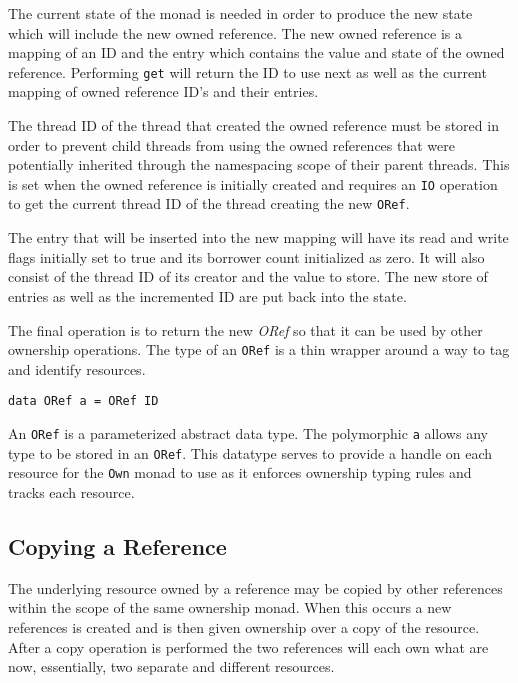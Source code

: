\documentclass[onehalf,11pt]{beavtex}
\begin{document}
The current state of the monad is needed in order
to produce the new state which will include the new owned reference.
The new owned reference is a mapping of an ID and the entry which contains
the value and state of the owned reference.
Performing \texttt{get} will return the ID to use next as well as the current
mapping of owned reference ID's and their entries.

The thread ID of the thread that created the owned reference must
be stored in order to prevent child threads from using the owned references that
were potentially inherited through the namespacing scope of their parent
threads.  This is set when the owned reference is initially created and requires
an \texttt{IO} operation to get the current thread ID of the thread
creating the new \texttt{ORef}.

The entry that will be inserted into the new mapping will have its read and
write flags initially set to true and its borrower count initialized as zero.
It will also consist of the thread ID of its creator and the value to store.
The new store of entries as well as the incremented ID are put back into the
state.

The final operation is to return the new \textit{ORef} so that it can be used by other
ownership operations.
The type of an \texttt{ORef} is a thin wrapper around a way to tag and identify
resources.

\begin{verbatim}
data ORef a = ORef ID
\end{verbatim}

An \texttt{ORef} is a parameterized abstract data type. The polymorphic
\texttt{a} allows any type to be stored in an \texttt{ORef}.
This datatype serves to provide a handle on each resource for the \texttt{Own}
monad to use as it enforces ownership typing rules and tracks each resource.

\subsection{Copying a Reference}

The underlying resource owned by a reference may be copied by other references
within the scope of the same ownership monad.  When this occurs a new
references is created and is then given ownership over a copy of the resource.
After a copy operation is performed the two references will each own what are now,
essentially, two separate and different resources.
\end{document}
